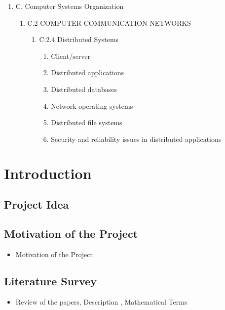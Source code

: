 \documentclass[12pt,a4paper]{article}
\begin{document}
\begin{enumerate}
	\item C. Computer Systems Organization 
	\begin{enumerate}
		\item C.2 COMPUTER-COMMUNICATION NETWORKS 
		\begin{enumerate}
			\item C.2.4 Distributed Systems 
			\begin{enumerate}
				\item  Client/server 
\item Distributed applications
\item Distributed databases
\item Network operating systems 
\item Distributed file systems
\item Security and reliability issues in distributed applications
	 		\end{enumerate} 
		\end{enumerate} 
	  

	
	\end{enumerate}
\end{enumerate}

\newpage	
\section{Introduction}
\setcounter{section}{3}

\subsection{Project Idea}
\label{sec:Project Idea}


\subsection{Motivation of the Project}  
\begin{itemize}
\item Motivation of the Project
\end{itemize}

\subsection{Literature Survey}

\begin{itemize}
\item Review of the papers, Description , Mathematical Terms 
\end{itemize}
\end{document}
